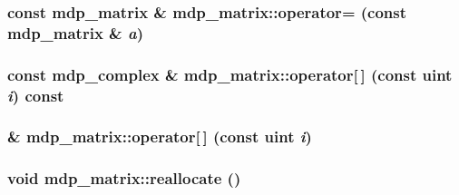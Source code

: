 \label{classmdp__matrix_a3d8e6aca507fe6daada3b337ba2e027e}
\hypertarget{classmdp__matrix_a5746a4a6feeaca44c8c9a02bd21e9d57}{
\subsubsection[{operator=}]{\setlength{\rightskip}{0pt plus 5cm}const {\bf mdp\_\-matrix} \& mdp\_\-matrix::operator= (const {\bf mdp\_\-matrix} \& {\em a})}}
\label{classmdp__matrix_a5746a4a6feeaca44c8c9a02bd21e9d57}
\hypertarget{classmdp__matrix_abbfeb632d8fbd7467350e02221fbc892}{
\subsubsection[{operator[]}]{\setlength{\rightskip}{0pt plus 5cm}const {\bf mdp\_\-complex} \& mdp\_\-matrix::operator\mbox{[}$\,$\mbox{]} (const {\bf uint} {\em i}) const}}
\label{classmdp__matrix_abbfeb632d8fbd7467350e02221fbc892}
\hypertarget{classmdp__matrix_af6008a99ddef98e8bbd072f624206a18}{
\subsubsection[{operator[]}]{ \& mdp\_\-matrix::operator\mbox{[}$\,$\mbox{]} (const {\bf uint} {\em i})}}
\label{classmdp__matrix_af6008a99ddef98e8bbd072f624206a18}
\hypertarget{classmdp__matrix_aae11eac9a3c0f2c0cc05450a67924cda}{
\subsubsection[{reallocate}]{\setlength{\rightskip}{0pt plus 5cm}void mdp\_\-matrix::reallocate ()}}
